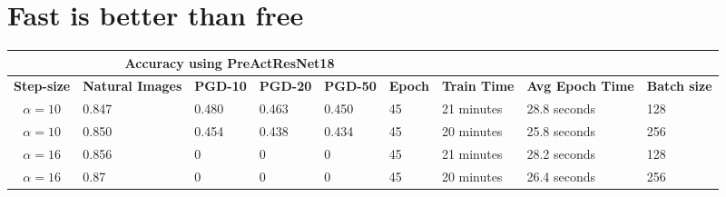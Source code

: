 \documentclass{article}
\begin{document}
\section{Fast is better than free}
\begin{center}

\begin{table}[hbt!]
\begin{tabular}{|c|l|l|l|l|l|l|l|l|}
\hline
\multicolumn{1}{|l|}{{ }} & \multicolumn{4}{c|}{{ \textbf{Accuracy using PreActResNet18}}}                                                                                                                                                                            & \multicolumn{4}{l|}{{ }}                                                                                                                                                                                                                         \\ \hline
{ \textbf{Step-size}}     & \multicolumn{1}{p{1.5cm}|}{{ \textbf{Natural Images}}} & \multicolumn{1}{c|}{{ \textbf{PGD-10}}} & \multicolumn{1}{c|}{{ \textbf{PGD-20}}} & \multicolumn{1}{c|}{{ \textbf{PGD-50}}} & \multicolumn{1}{c|}{{ \textbf{Epoch}}} & \multicolumn{1}{c|}{{ \textbf{Train Time}}} & \multicolumn{1}{p{1.5cm}|}{{ \textbf{Avg Epoch Time}}} & \multicolumn{1}{c|}{{ \textbf{Batch size}}} \\ \hline
{ $\alpha = 10$}       & { 0.847}                                        & { 0.480}                                & { 0.463}                                & { 0.450}                                & { 45}                                  & { 21 minutes}                               & { 28.8  seconds}                                & { 128}                                      \\ \hline
{ $\alpha = 10$}       & { 0.850}                                        & { 0.454}                                & { 0.438}                                & { 0.434}                                & { 45}                                  & { 20 minutes}                               & { 25.8 seconds}                                 & { 256}                                      \\ \hline
{ $\alpha = 16$}       & { 0.856}                                        & { 0}                                    & { 0}                                    & { 0}                                    & { 45}                                  & { 21 minutes}                               & { 28.2 seconds}                                 & { 128}                                      \\ \hline
{ $\alpha = 16$}       & { 0.87}                                         & { 0}                                    & { 0}                                    & { 0}                                    & { 45}                                  & { 20 minutes}                               & { 26.4 seconds}                                 & { 256}                                      \\ \hline
\end{tabular}
\end{table}
\end{center}
\end{document}
